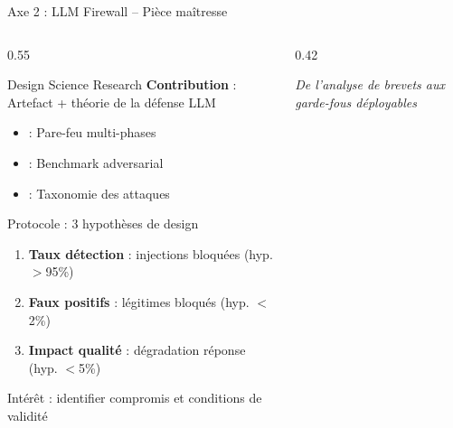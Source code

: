 \documentclass[aspectratio=169,11pt]{beamer}
\begin{document}
\begin{frame}{Axe 2 : LLM Firewall -- Pièce maîtresse}
  \begin{columns}[T]
    \begin{column}{0.55\textwidth}
      \begin{block}{Design Science Research}
        \textbf{Contribution} : Artefact + théorie de la défense LLM
        
        \vspace{0.3em}
        
        \begin{itemize}\small
          \item {} : Pare-feu multi-phases
          \item {} : Benchmark adversarial
          \item {} : Taxonomie des attaques
        \end{itemize}
      \end{block}
      
      \begin{exampleblock}{Protocole : 3 hypothèses de design}
        \begin{enumerate}\scriptsize
          \item \textbf{Taux détection} : injections bloquées (hyp. $>$95\%)
          \item \textbf{Faux positifs} : légitimes bloqués (hyp. $<$2\%)
          \item \textbf{Impact qualité} : dégradation réponse (hyp. $<$5\%)
        \end{enumerate}
        {\tiny Intérêt : identifier compromis et conditions de validité}
      \end{exampleblock}
    \end{column}
    \begin{column}{0.42\textwidth}
      \centering
      
      \vspace{0.5em}
      
      {\footnotesize\textit{De l'analyse de brevets aux garde-fous déployables}}
    \end{column}
  \end{columns}
\end{frame}
\end{document}
